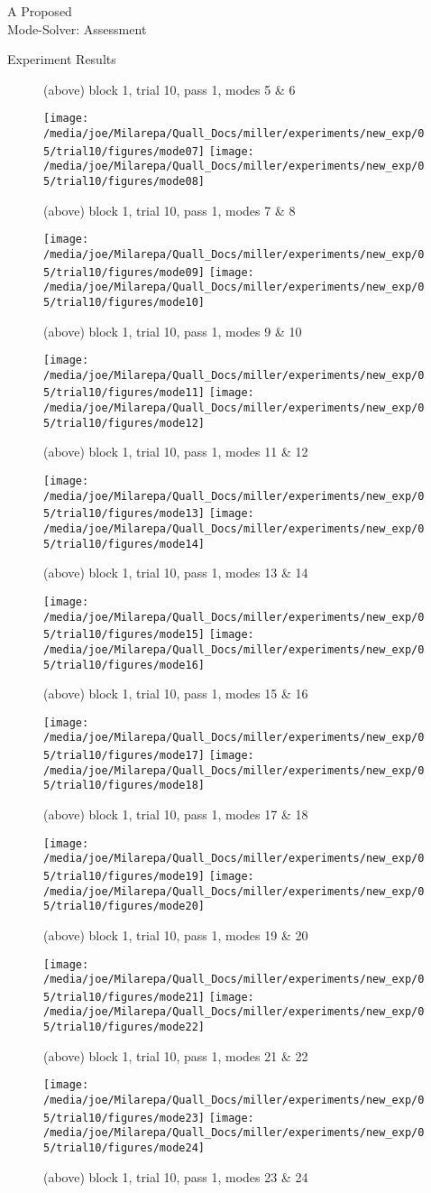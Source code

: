 \documentclass[a4paper,10pt]{report}
\numberwithin{equation}{section}
\begin{document}
\begin{chapter}{A Proposed \\Mode-Solver: Assessment}
\begin{section}{Experiment Results}
\begin{singlespace}
\begin{figure}[h]
\caption{(above) block 1, trial 10, pass 1, modes 5 \& 6}
\end{figure}
\begin{figure}[h]
\texttt{[image: /media/joe/Milarepa/Quall\_Docs/miller/experiments/new\_exp/05/trial10/figures/mode07]}
\texttt{[image: /media/joe/Milarepa/Quall\_Docs/miller/experiments/new\_exp/05/trial10/figures/mode08]}
\caption{(above) block 1, trial 10, pass 1, modes 7 \& 8}
\texttt{[image: /media/joe/Milarepa/Quall\_Docs/miller/experiments/new\_exp/05/trial10/figures/mode09]}
\texttt{[image: /media/joe/Milarepa/Quall\_Docs/miller/experiments/new\_exp/05/trial10/figures/mode10]}
\caption{(above) block 1, trial 10, pass 1, modes 9 \& 10}
\texttt{[image: /media/joe/Milarepa/Quall\_Docs/miller/experiments/new\_exp/05/trial10/figures/mode11]}
\texttt{[image: /media/joe/Milarepa/Quall\_Docs/miller/experiments/new\_exp/05/trial10/figures/mode12]}
\caption{(above) block 1, trial 10, pass 1, modes 11 \& 12}
\end{figure}
\begin{figure}[h]
\texttt{[image: /media/joe/Milarepa/Quall\_Docs/miller/experiments/new\_exp/05/trial10/figures/mode13]}
\texttt{[image: /media/joe/Milarepa/Quall\_Docs/miller/experiments/new\_exp/05/trial10/figures/mode14]}
\caption{(above) block 1, trial 10, pass 1, modes 13 \& 14}
\texttt{[image: /media/joe/Milarepa/Quall\_Docs/miller/experiments/new\_exp/05/trial10/figures/mode15]}
\texttt{[image: /media/joe/Milarepa/Quall\_Docs/miller/experiments/new\_exp/05/trial10/figures/mode16]}
\caption{(above) block 1, trial 10, pass 1, modes 15 \& 16}
\texttt{[image: /media/joe/Milarepa/Quall\_Docs/miller/experiments/new\_exp/05/trial10/figures/mode17]}
\texttt{[image: /media/joe/Milarepa/Quall\_Docs/miller/experiments/new\_exp/05/trial10/figures/mode18]}
\caption{(above) block 1, trial 10, pass 1, modes 17 \& 18}
\end{figure}
\begin{figure}[h]
\texttt{[image: /media/joe/Milarepa/Quall\_Docs/miller/experiments/new\_exp/05/trial10/figures/mode19]}
\texttt{[image: /media/joe/Milarepa/Quall\_Docs/miller/experiments/new\_exp/05/trial10/figures/mode20]}
\caption{(above) block 1, trial 10, pass 1, modes 19 \& 20}
\texttt{[image: /media/joe/Milarepa/Quall\_Docs/miller/experiments/new\_exp/05/trial10/figures/mode21]}
\texttt{[image: /media/joe/Milarepa/Quall\_Docs/miller/experiments/new\_exp/05/trial10/figures/mode22]}
\caption{(above) block 1, trial 10, pass 1, modes 21 \& 22}
\texttt{[image: /media/joe/Milarepa/Quall\_Docs/miller/experiments/new\_exp/05/trial10/figures/mode23]}
\texttt{[image: /media/joe/Milarepa/Quall\_Docs/miller/experiments/new\_exp/05/trial10/figures/mode24]}
\caption{(above) block 1, trial 10, pass 1, modes 23 \& 24}
\end{figure}
\end{singlespace}
\end{section}
\end{chapter}
\end{document}
